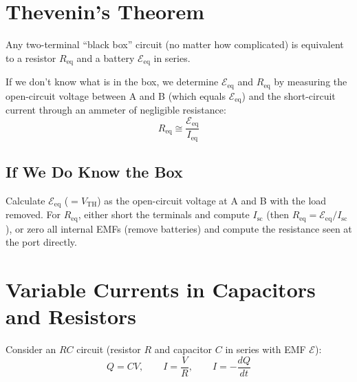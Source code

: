 \section{Thevenin's Theorem}

\begin{theorem}
Any two-terminal ``black box'' circuit (no matter how complicated) is equivalent to a resistor $R_\text{eq}$ and a battery $\mathcal{E}_\text{eq}$ in series.
\end{theorem}

If we don't know what is in the box, we determine $\mathcal{E}_\text{eq}$ and $R_\text{eq}$ by measuring the open-circuit voltage between A and B (which equals $\mathcal{E}_\text{eq}$) and the short-circuit current through an ammeter of negligible resistance:
\[
    \boxed{R_\text{eq} \cong \frac{\mathcal{E}_\text{eq}}{I_\text{eq}}}
\]

\subsection{If We Do Know the Box}

Calculate $\mathcal{E}_\text{eq}$ ($= V_\text{TH}$) as the open-circuit voltage at A and B with the load removed. For $R_\text{eq}$, either short the terminals and compute $I_\text{sc}$ (then $R_\text{eq} = \mathcal{E}_\text{eq}/I_\text{sc}$), or zero all internal EMFs (remove batteries) and compute the resistance seen at the port directly.

\section{Variable Currents in Capacitors and Resistors}

Consider an $RC$ circuit (resistor $R$ and capacitor $C$ in series with EMF $\mathcal{E}$):
\[
    Q = CV, \qquad I = \frac{V}{R}, \qquad I = -\frac{dQ}{dt}
\]

